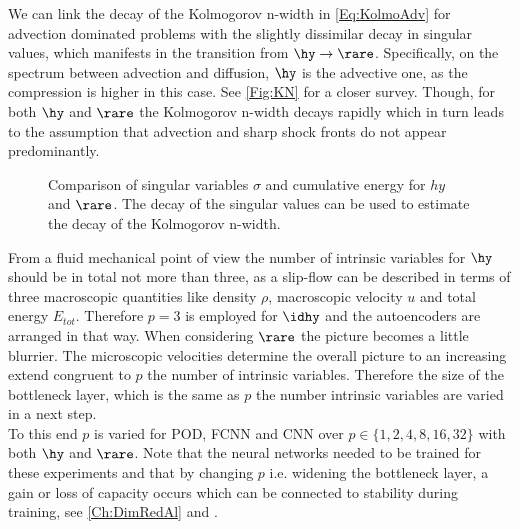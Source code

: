 We can link the decay of the Kolmogorov n-width in \cref{Eq:KolmoAdv} for advection dominated problems with the slightly dissimilar decay in singular values, which manifests in the transition from \(\hy \rightarrow \rare \). Specifically, on the spectrum between advection and diffusion, \(\hy\) is the advective one, as the compression is higher in this case. See \cref{Fig:KN} for a closer survey. Though, for both \(\hy\) and \(\rare\) the Kolmogorov n-width decays rapidly which in turn leads to the assumption that advection and sharp shock fronts do not appear predominantly.
\begin{figure}[!htbp]
	\begin{subfigure}{.45\textwidth}
		
		\label{Fig:CumSum_Rare}
	\end{subfigure}\hfill
	\begin{subfigure}{.45\textwidth}
		
		\label{Fig:CumSum_Hydro}
	\end{subfigure}
	\caption{Comparison of singular variables \(\sigma\) and cumulative energy for \(hy\) and \(\rare\). The decay of the singular values can be used to estimate the decay of the Kolmogorov n-width.}
	\label{Fig:CUSUM-e}
\end{figure}
From a fluid mechanical point of view the number of intrinsic variables for \(\hy\) should be in total not more than three, as a slip-flow can be described in terms of three macroscopic quantities like density \(\rho\), macroscopic velocity \(u\) and total energy \(E_{tot}\)\cite{BGK}\cite{Bernard}. Therefore \(p=3\) is employed for \(\idhy\) and the autoencoders are arranged in that way. When considering \(\rare\) the picture becomes a little blurrier. The microscopic velocities determine the overall picture to an increasing extend congruent to \(p\) the number of intrinsic variables. Therefore the size of the bottleneck layer, which is the same as \(p\) the number intrinsic variables are varied in a next step.\\ To this end $p$ is varied for POD, FCNN and CNN over $p \in \{1,2,4,8,16,32\}$ with both $\hy$ and $\rare$. Note that the neural networks needed to be trained for these experiments and that by changing $p$ i.e. widening the bottleneck layer, a gain or loss of capacity occurs which can be connected to stability during training, see \cref{Ch:DimRedAl} and \cite{Goodfellow}.
